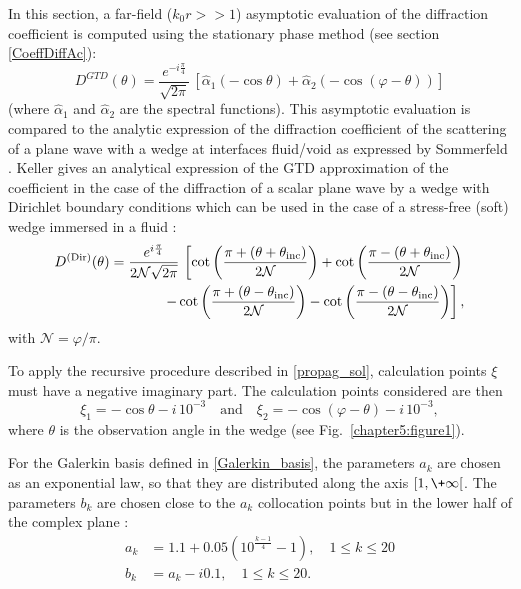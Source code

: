 In this section, a far-field ($k_0r>>1$) asymptotic evaluation of the diffraction coefficient is computed using the stationary phase method (see section \ref{CoeffDiffAc}):
\begin{equation}
D^{GTD}(\theta) = \dfrac{e^{-i\frac{\pi}{4}}}{\sqrt{2\pi}} \, [\hat{\alpha}_1( - \cos \theta) + \hat{\alpha}_2( - \cos ( \varphi - \theta))]
\end{equation}
(where $\hat{\alpha}_1$ and $\hat{\alpha}_2$ are the spectral functions). This asymptotic evaluation is compared to the analytic expression of the diffraction coefficient of the scattering of a plane wave with a wedge at interfaces fluid/void as expressed by Sommerfeld \cite{Sommerfeld}. Keller \cite{GTD} gives an analytical expression of the GTD approximation of the coefficient in the case of the diffraction of a scalar plane wave by a wedge with Dirichlet boundary conditions which can be used in the case of a stress-free (soft) wedge immersed in a fluid :
\begin{align}
\label{GTDCoeff_Dir}
D^{\rm (Dir)}(\theta) = \dfrac{e^{i\frac{\pi}{4}}}{2\mathcal{N} \sqrt{2\pi}}  \, \left[ \cot \left( \dfrac{\pi + (\theta + \theta_{\rm inc})}{2\mathcal{N}} \right) + \cot \left( \dfrac{\pi - (\theta + \theta_{\rm inc})}{2\mathcal{N}} \right) \right.   \nonumber \\
\left. - \cot \left( \dfrac{\pi + (\theta - \theta_{\rm inc})}{2\mathcal{N}} \right) - \cot \left( \dfrac{\pi - (\theta - \theta_{\rm inc})}{2\mathcal{N}} \right) \right],
\end{align}
with $\mathcal{N}=\varphi/\pi$.

To apply the recursive procedure described in \ref{propag_sol}, calculation points $\xi$ must have a negative imaginary part. The calculation points considered are then
\begin{equation}
\label{calculation_points_recursive}
\xi_1 = -\cos \theta -i\,10^{-3}  \quad \text{and} \quad \xi_2=- \cos (\varphi - \theta) - i\, 10^{-3} ,
\end{equation}
where $\theta$ is the observation angle in the wedge (see Fig.~\ref{chapter5:figure1}).

For the Galerkin basis defined in \eqref{Galerkin_basis}, the parameters $a_k$ are chosen as an exponential law, so that they are distributed along the axis $\lbrack 1,\+\infty\lbrack$. The parameters $b_k$ are chosen close to the $a_k$ collocation points but in the lower half of the complex plane :
\begin{equation}
\begin{split}
\label{bas_Gal}
a_k &= 1.1 + 0.05 \left( 10^{\frac{k -1}{4}} - 1 \right), \quad 1\leq k\leq 20 \\
b_k &= a_k  - i 0.1, \quad 1\leq k\leq 20 .
\end{split}
\end{equation}

